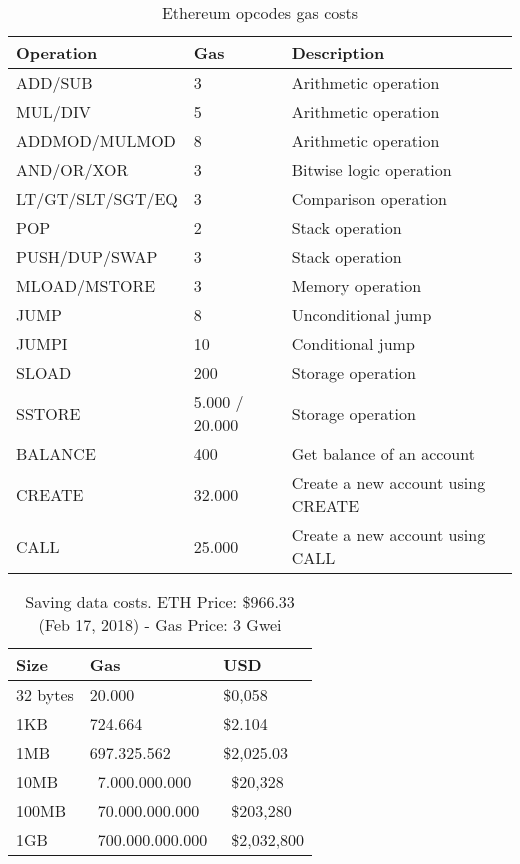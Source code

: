 \begin{table}[!ht]
\centering
\begin{tabular}{|l|l|l|}
\hline
 Operation & Gas  & Description \\ \hline
 ADD/SUB & 3 & Arithmetic operation \\ \hline
 MUL/DIV & 5 & Arithmetic operation \\ \hline
 ADDMOD/MULMOD & 8 & Arithmetic operation \\ \hline
 AND/OR/XOR & 3 & Bitwise logic operation \\ \hline
 LT/GT/SLT/SGT/EQ & 3 & Comparison operation \\ \hline
 POP & 2 & Stack operation \\ \hline
 PUSH/DUP/SWAP & 3 & Stack operation \\ \hline
 MLOAD/MSTORE & 3 & Memory operation \\ \hline
 JUMP & 8 & Unconditional jump \\ \hline
 JUMPI & 10 & Conditional jump \\ \hline
 SLOAD & 200 & Storage operation \\ \hline
 SSTORE & 5.000 / 20.000 & Storage operation \\ \hline
 BALANCE & 400 & Get balance of an account \\ \hline
 CREATE & 32.000 & Create a new account using CREATE \\ \hline
 CALL & 25.000 & Create a new account using CALL \\ \hline
\end{tabular}
\caption{Ethereum opcodes gas costs}
\label{table:opcode_gas_cost}
\end{table}

\begin{table}[!ht]
\centering
\begin{tabular}{|l|l|l|}
\hline
 Size & Gas  & USD \\ \hline
 32 bytes & 20.000  & \$0,058 \\ \hline
 1KB & 724.664  & \$2.104 \\ \hline
 1MB & 697.325.562  & \$2,025.03 \\ \hline
 10MB & ~7.000.000.000  & ~\$20,328 \\ \hline
 100MB & ~70.000.000.000  & ~\$203,280 \\ \hline
 1GB & ~700.000.000.000  & ~\$2,032,800 \\ \hline
\end{tabular}
\caption{Saving data costs. ETH Price: \$966.33 (Feb 17, 2018) - Gas Price: 3 Gwei}
\label{table:bytes_usd_cost}
\end{table}

